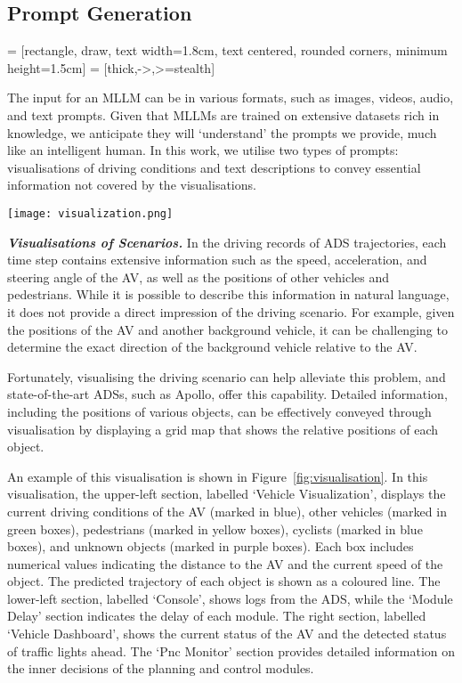 \subsection{Prompt Generation}
 = [rectangle, draw, text width=1.8cm, text centered, rounded corners, minimum height=1.5cm]
 = [thick,->,>=stealth]



The input for an MLLM can be in various formats, such as images, videos, audio, and text prompts. Given that MLLMs are trained on extensive datasets rich in knowledge, we anticipate they will `understand' the prompts we provide, much like an intelligent human. In this work, we utilise two types of prompts: visualisations of driving conditions and text descriptions to convey essential information not covered by the visualisations.

\begin{figure*}[htbp]
    \centering
    \texttt{[image: visualization.png]}
    \caption{Visualisation of a scenario, which is provided to the MLLM along with an `overall prompt'} 
    \label{fig:visualisation} 
    \vspace{-0.6cm}
\end{figure*}

\noindent\emph{\textbf{Visualisations of Scenarios.}}
In the driving records of ADS trajectories, each time step contains extensive information such as the speed, acceleration, and steering angle of the AV, as well as the positions of other vehicles and pedestrians. While it is possible to describe this information in natural language, it does not provide a direct impression of the driving scenario. For example, given the positions of the AV and another background vehicle, it can be challenging to determine the exact direction of the background vehicle relative to the AV.

Fortunately, visualising the driving scenario can help alleviate this problem, and state-of-the-art ADSs, such as Apollo, offer this capability. Detailed information, including the positions of various objects, can be effectively conveyed through visualisation by displaying a grid map that shows the relative positions of each object.


An example of this visualisation is shown in Figure~\ref{fig:visualisation}. In this visualisation, the upper-left section, labelled `Vehicle Visualization', displays the current driving conditions of the AV (marked in blue), other vehicles (marked in green boxes), pedestrians (marked in yellow boxes), cyclists (marked in blue boxes), and unknown objects (marked in purple boxes). Each box includes numerical values indicating the distance to the AV and the current speed of the object. The predicted trajectory of each object is shown as a coloured line.
The lower-left section, labelled `Console', shows logs from the ADS, while the `Module Delay' section indicates the delay of each module.
The right section, labelled `Vehicle Dashboard', shows the current status of the AV and the detected status of traffic lights ahead. The `Pnc Monitor' section provides detailed information on the inner decisions of the planning and control modules.


